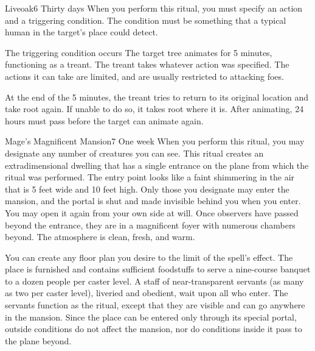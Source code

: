 \begin{spellsection}{Liveoak}{6}
\spelldur Thirty days
\spellspecial When you perform this ritual, you must specify an action and a triggering condition. The condition must be something that a typical human in the target's place could detect.
\begin{spelltrigger}{The triggering condition occurs}
    \spelleffect The target tree animates for 5 minutes, functioning as a treant. The treant takes whatever action was specified. The actions it can take are limited, and are usually restricted to attacking foes.

    At the end of the 5 minutes, the treant tries to return to its original location and take root again. If unable to do so, it takes root where it is. After animating, 24 hours must pass before the target can animate again.
\end{spelltrigger}
\end{spellsection}

\begin{spellsection}{Mage's Magnificent Mansion}{7}
\spelldur One week \dismissable
\spellspecial When you perform this ritual, you may designate any number of creatures you can see.
\spellline
\spelleffect This ritual creates an extradimensional dwelling that has a single entrance on the plane from which the ritual was performed. The entry point looks like a faint shimmering in the air that is 5 feet wide and 10 feet high. Only those you designate may enter the mansion, and the portal is shut and made invisible behind you when you enter. You may open it again from your own side at will. Once observers have passed beyond the entrance, they are in a magnificent foyer with numerous chambers beyond. The atmosphere is clean, fresh, and warm.
\par You can create any floor plan you desire to the limit of the spell's effect. The place is furnished and contains sufficient foodstuffs to serve a nine-course banquet to a dozen people per caster level. A staff of near-transparent servants (as many as two per caster level), liveried and obedient, wait upon all who enter. The servants function as the  ritual, except that they are visible and can go anywhere in the mansion.
\spellnotes Since the place can be entered only through its special portal, outside conditions do not affect the mansion, nor do conditions inside it pass to the plane beyond.
\end{spellsection}

